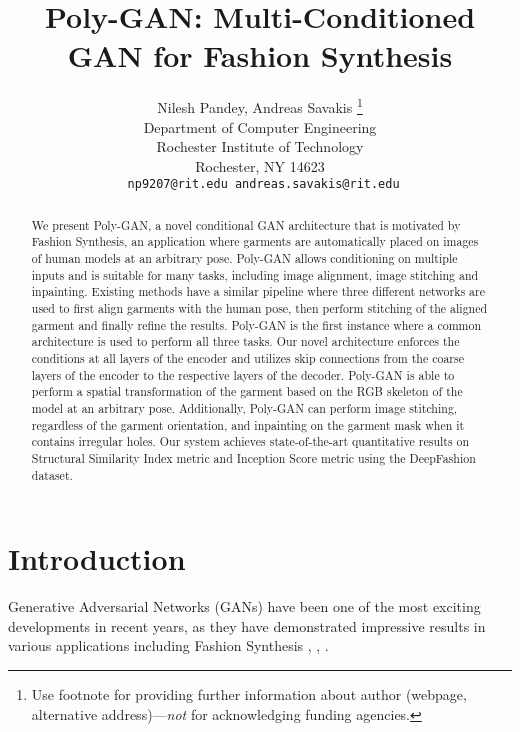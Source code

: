 \documentclass[11pt]{article}
\title{Poly-GAN: Multi-Conditioned GAN for Fashion Synthesis}
\author{
  Nilesh Pandey, Andreas Savakis
 \thanks{Use footnote for providing further information about author (webpage, alternative address)---\emph{not} for acknowledging
    funding agencies.} \\
  Department of Computer Engineering\\
 Rochester Institute of Technology\\
  Rochester, NY 14623 \\
  \texttt{ np9207@rit.edu andreas.savakis@rit.edu} \\
}
\begin{document}
\maketitle

\begin{abstract}
We present Poly-GAN, a novel conditional GAN architecture that is motivated by Fashion Synthesis, an application where garments are automatically placed on images of human models at an arbitrary pose.
Poly-GAN allows conditioning on multiple inputs and is suitable for many tasks, including image alignment, image stitching and inpainting. 
Existing methods have a similar pipeline where three different networks are used to first align garments with the human pose, then perform stitching of the aligned garment and finally refine the results.
Poly-GAN is the first instance where a common architecture is used to perform all three tasks.
Our novel architecture enforces the conditions at all layers of the encoder and utilizes skip connections from the coarse layers of the encoder to the respective layers of the decoder. Poly-GAN is able to perform a spatial transformation of the garment based on the RGB skeleton of the model at an arbitrary pose.  Additionally, Poly-GAN can perform image stitching, regardless of the garment orientation,
and
inpainting on the garment mask when it contains irregular holes.
Our system achieves state-of-the-art quantitative results on Structural Similarity Index metric and Inception Score metric using the DeepFashion dataset.

\end{abstract}

\section{Introduction}
\label{headings}
Generative Adversarial Networks (GANs) have been one of the most exciting developments in recent years, as they have demonstrated impressive results in various applications including Fashion Synthesis \citet{Prada}, \citet{StyleGAN}, \citet{VITON}.
\end{document}
